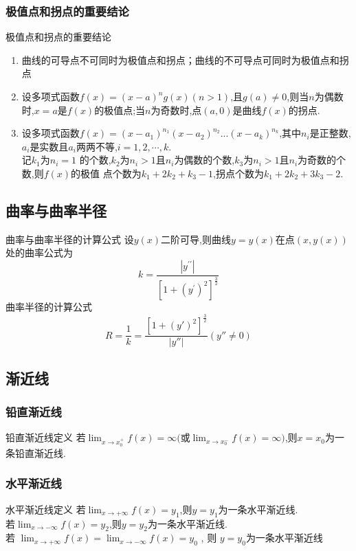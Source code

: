 \documentclass[8pt a4paper, oneside, UTF8]{ctexbook}  %
\begin{document}
\begin{sloppypar}
    \subsubsection{极值点和拐点的重要结论}
    \begin{conclusion}{极值点和拐点的重要结论}{}
        \begin{enumerate}
            \item 曲线的可导点不可同时为极值点和拐点；曲线的不可导点可同时为极值点和拐点
            \item 设多项式函数$f(x)=(x-a)^n g(x)(n>1)$,且$g(a)\neq0$,则当$n$为偶数时,$x=a$是$f(x)$的极值点;当$n$为奇数时,点$(a,0)$是曲线$f(x)$的拐点.
            \item 设多项式函数$f(x)=(x-a_1)^{n_1}(x-a_2)^{n_2}...(x-a_k)^{n_k}$,其中$n_i$是正整数,$a_i$是实数且$a_i$两两不等,$i= 1, 2, \cdots,k$.\\记$k_1$为$n_i=1$ 的个数,$k_2$为$n_i>1$且$n_i$为偶数的个数,$k_3$为$n_i>1$且$n_i$为奇数的个数,则$f(x)$的极值
            点个数为$k_1+2k_2+k_3-1$,拐点个数为$k_1+2k_2+3k_3-2.$
        \end{enumerate}
    \end{conclusion}
    \subsection{曲率与曲率半径}
    \begin{defn}{曲率与曲率半径的计算公式}{}
        设$y(x)$二阶可导,则曲线$y=y(x)$在点$(x,y(x))$处的曲率公式为
        $$
            k=\dfrac{\left|y^{\prime\prime}\right|}{\left[1+(y^{\prime})^2\right]^{\frac{3}{2}}}
        $$
        曲率半径的计算公式
        $$
            R=\dfrac{1}{k}=\dfrac{\left[1+(y')^2\right]^{\frac{3}{2}}}{\left|y''\right|}(y''\neq0)
        $$
    \end{defn}
    \subsection{渐近线}
    \subsubsection{铅直渐近线}  
    \begin{defn}{铅直渐近线定义}{}
        若$\lim_{x\to x_0^+}f(x)=\infty($或$\lim_{x\to x_0^-}f(x)=\infty)$,则$x=x_0$为一条铅直渐近线.
    \end{defn}
    \subsubsection{水平渐近线}
        \begin{defn}{水平渐近线定义}{}
            若$\lim_{x\to+\infty} f(x)=y_{1}$,则$y=y_1$为一条水平渐近线.\\
            若$\lim_{x\to-\infty} f(x)=y_{2}$,则$y=y_{2}$为一条水平渐近线.\\
            ${\text{若 }}\lim _{x\to + \infty }f( x) = \lim _{x\to - \infty }f( x) = y_{0}$ , ${\text{则  }y= y_{0}}$为一条水平渐近线
        \end{defn}

\end{sloppypar}
\end{document}
